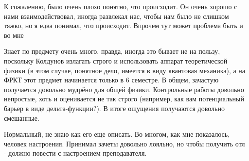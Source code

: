                 \begin{commentbox} 
                    К сожалению, было очень плохо понятно, что происходит. Он очень хорошо с нами взаимодействовал, иногда развлекал нас, чтобы нам было не слишком тяжко, но я едва понимал, что происходит. Впрочем тут может проблема быть и во мне 
                \end{commentbox} 
            
                \begin{commentbox} 
                    Знает по предмету очень много, правда, иногда это бывает не на пользу, поскольку Колдунов излагать строго и использовать аппарат теоретической физики (в этом случае, понятное дело, имеется в виду квантовая механика), а на ФРКТ этот предмет начинается только в 6 семестре. В общем, зачастую получается довольно мудрёно для общей физики. Контрольные работы довольно непростые, хоть и оценивается не так строго (например, как вам потенциальный барьер в виде дельта-функции?). В итоге ощущения получаются довольно смешанные. 
                \end{commentbox} 
            
                \begin{commentbox} 
                    Нормальный, не знаю как его еще описать. Во многом, как мне показалось, человек настроения. Принимал зачеты довольно лояльно, но чтобы получить отл - должно повести с настроением преподавателя.
                \end{commentbox} 


